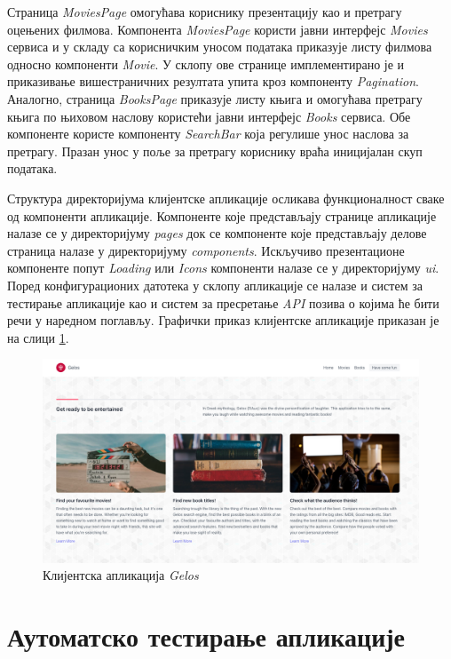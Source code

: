 \documentclass[12pt,oneside]{memoir}
\begin{document}
Страница \textit{MoviesPage} омогућава кориснику презентацију као и претрагу оцењених филмова. Компонента  \textit{MoviesPage} користи јавни интерфејс \textit{Movies} сервиса и у складу са корисничким уносом података приказује листу филмова односно компоненти \textit{Movie}.  У склопу ове странице имплементирано је и приказивање вишестраничних резултата упита кроз компоненту \textit{Pagination}. Аналогно, страница \textit{BooksPage} приказује листу књига и омогућава претрагу књига по њиховом наслову користећи јавни интерфејс \textit{Books} сервиса. Обе компоненте користе компоненту \textit{SearchBar} која регулише унос наслова за претрагу. Празан унос у поље за претрагу кориснику враћа иницијалан скуп података.

Структура директоријума клијентске апликације осликава функционалност сваке од компоненти апликације. Компоненте које представљају странице апликације налазе се у директоријуму \textit{pages} док се компоненте које представљају делове страница налазе у директоријуму \textit{components}. Искључиво презентационе компоненте попут \textit{Loading} или \textit{Icons} компоненти налазе се у директоријуму \textit{ui}. Поред конфигурационих датотека у склопу апликације се налазе и систем за тестирање апликације као и систем за пресретање \textit{API} позива о којима ће бити речи у наредном поглављу. Графички приказ клијентске апликације приказан је на слици \ref{fig:client}.

\begin{figure}[!ht]
  \centering
  \includegraphics[width=\textwidth]{matfmaster/img/client.png}
  \caption{Клијентска апликација \textit{Gelos}}
  \label{fig:client}
\end{figure}

\section{Аутоматско тестирање апликације}
\end{document}
